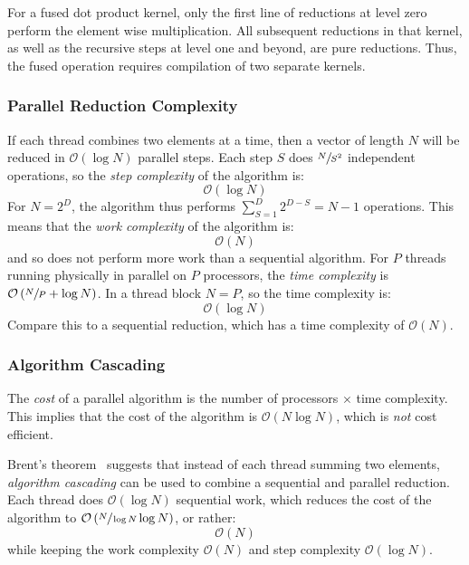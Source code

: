 For a fused dot product kernel, only the first line of reductions at level zero
perform the element wise multiplication. All subsequent reductions in that
kernel, as well as the recursive steps at level one and beyond, are pure
reductions. Thus, the fused operation requires compilation of two separate
kernels. %

\subsubsection{Parallel Reduction Complexity}
\label{sec:parallel_reduction_complexity}

If each thread combines two elements at a time, then a vector of length $N$ will
be reduced in $\mathcal{O}\left( \log N \right)$ parallel steps. Each step $S$
does $\sfrac{N}{S^2}$ independent operations, so the \emph{step
complexity} of the algorithm is:
\[
\mathcal{O}\left( \log N \right)
\]
For $N=2^{D}$, the algorithm thus performs $\sum_{S=1}^{D}2^{D-S} = N - 1$
operations. This means that the \emph{work complexity} of
the algorithm is:
\[
\mathcal{O}\left( N \right)
\]
and so does not perform more work than a sequential algorithm. For $P$ threads
running physically in parallel on $P$ processors, the \emph{time
complexity} is $\mathcal{O}\left( \sfrac{N}{P} + \log N
\right)$. In a thread block $N = P$, so the time complexity is:
\[
\mathcal{O}\left( \log N \right)
\]
Compare this to a sequential reduction, which has a time complexity of
$\mathcal{O}\left( N \right)$.

\subsubsection{Algorithm Cascading}
\label{sec:algorithm_cascading}

The \emph{cost} of a parallel algorithm is the number of processors $\times$
time complexity. This implies that the cost of the algorithm is
$\mathcal{O}\left( N \log N \right)$, which is \emph{not} cost efficient.

Brent's theorem~\cite{Chatterjee:2009vh} suggests that instead of each thread
summing two elements, \emph{algorithm cascading} can be used to combine a
sequential and parallel reduction. Each thread does $\mathcal{O}\left( \log N
\right)$ sequential work, which reduces the cost of the algorithm to
$\mathcal{O}\left( \sfrac{N}{\log N} \log N \right)$, or rather:
\[
\mathcal{O}\left( N \right)
\]
while keeping the work complexity $\mathcal{O}\left( N \right)$ and step
complexity $\mathcal{O}\left( \log N \right)$.

